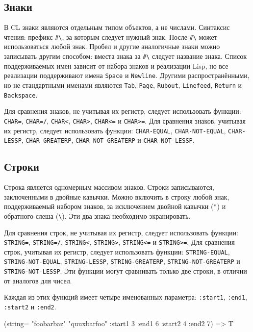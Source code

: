 \subsection{Знаки}
В CL знаки являются отдельным типом объектов, а не числами. Синтаксис чтения: префикс \lstinline{#\}, за которым следует нужный знак. После \lstinline{#\} может использоваться любой знак. Пробел и другие аналогичные знаки можно записывать другим способом: вместа знака за \lstinline{#\} следует название знака. Список поддерживаемых имен зависит от набора знаков и реализации Lisp, но все реализации поддерживают имена \lstinline{Space} и \lstinline{Newline}. Другими распространёнными, но не стандартными именами являются \lstinline{Tab}, \lstinline{Page}, \lstinline{Rubout}, \lstinline{Linefeed}, \lstinline{Return} и \lstinline{Backspace}.

Для сравнения знаков, не учитывая их регистр, следует использовать функции: \lstinline{CHAR=}, \lstinline{CHAR=/}, \lstinline{CHAR<}, \lstinline{CHAR>}, \lstinline{CHAR<=} и \lstinline{CHAR>=}. Для сравнения знаков, учитывая их регистр, следует использовать функции: \lstinline{CHAR-EQUAL}, \lstinline{CHAR-NOT-EQUAL}, \lstinline{CHAR-LESSP}, \lstinline{CHAR-GREATERP}, \lstinline{CHAR-NOT-GREATERP} и \lstinline{CHAR-NOT-LESSP}.

\subsection{Строки}
Строка является одномерным массивом знаков. Строки записываются, заключенными в двойные кавычки. Можно включить в строку любой знак, поддерживаемый набором знаков, за исключением двойной кавычки (\lstinline{"}) и обратного слеша (\lstinline{\}). Эти два знака необходимо экранировать.

Для сравнения строк, не учитывая их регистр, следует использовать функции: \lstinline{STRING=}, \lstinline{STRING=/}, \lstinline{STRING<}, \lstinline{STRING>}, \lstinline{STRING<=} и \lstinline{STRING>=}. Для сравнения строк, учитывая их регистр, следует использовать функции: \lstinline{STRING-EQUAL}, \lstinline{STRING-NOT-EQUAL}, \lstinline{STRING-LESSP}, \lstinline{STRING-GREATERP}, \lstinline{STRING-NOT-GREATERP} и \lstinline{STRING-NOT-LESSP}. Эти функции могут сравнивать только две строки, в отличии от аналогов для чисел.

Каждая из этих функций имеет четыре именованных параметра: \lstinline{:start1}, \lstinline{:end1}, \lstinline{:start2} и \lstinline{:end2}.
\begin{cllst}{}{}
(string= "foobarbaz" "quuxbarfoo" :start1 3 :end1 6 :start2 4 :end2 7) => T
\end{cllst}

